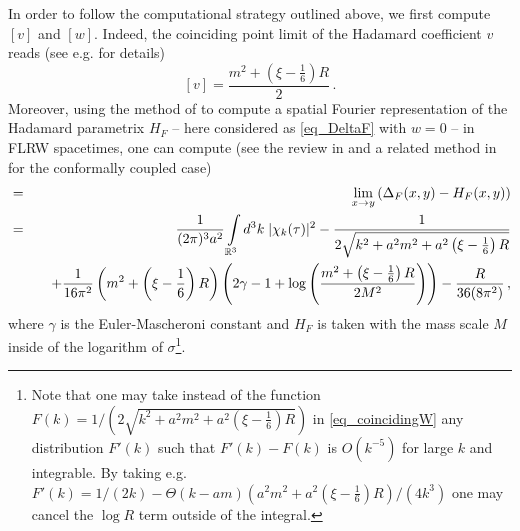 \documentclass[a4paper,10pt,twoside]{article}
\numberwithin{equation}{section}
\newcounter{and}
\def\bbR{\mathbb{R}}
\theoremstyle{plain}
\theoremstyle{definition}
\begin{document}
In order to follow the computational strategy outlined above, we first compute $[v]$ and $[w]$.  Indeed, the coinciding point limit of the Hadamard coefficient $v$ reads (see e.g. \cite[Section III.1.2]{Hack:2010iw} for details)
\begin{equation}
\label{eq_coincidingV}[v]=\frac{m^2+\left(\xi-\frac16\right)R}{2}\,.
\end{equation}
Moreover, using the method of \cite{Schlemmer} to compute a spatial Fourier representation of the Hadamard parametrix $H_F$ -- here considered as \eqref{eq_DeltaF} with $w=0$ -- in FLRW spacetimes, one can compute (see the review in \cite{Degner} and a related method in \cite{Pinamonti:2010is} for the conformally coupled case)
\begin{eqnarray}
[w]&=&\lim_{x\to y}\left(\Delta_F(x,y)-H_F(x,y)\right)\notag\\
%
\label{eq_coincidingW}&=&\frac{1}{(2\pi)^3 a^2}\int\limits_{\bbR^3}d^3k\; |\chi_k(\tau)|^2-\frac{1}{2\sqrt{k^2+a^2m^2+a^2\left(\xi-\frac16\right)R}}\\
%
&&\quad +\frac{1}{16\pi^2}\left(m^2+\left(\xi-\frac16\right)R\right)\left(2\gamma-1+\log\left(
\frac{m^2+\left(\xi-\frac16\right)R}{2M^2}\right)\right)-\frac{R}{36(8\pi^2)}\notag\,,
\end{eqnarray}
where $\gamma$ is the Euler-Mascheroni constant and $H_F$ is taken with the mass scale $M$ inside of the logarithm of $\sigma$\footnote{Note that one may take instead of the function  $F(k)=1/(2\sqrt{k^2+a^2m^2+a^2\left(\xi-\frac16\right)R})$ in \eqref{eq_coincidingW} any distribution $F'(k)$ such that $F'(k)-F(k)$ is $O(k^{-5})$ for large $k$ and integrable. By taking e.g. $F'(k)=1/(2k)-\Theta(k-am)(a^2m^2+a^2\left(\xi-\frac16\right)R)/(4k^3)$ one may cancel the $\log R$ term outside of the integral.}. 
\end{document}
